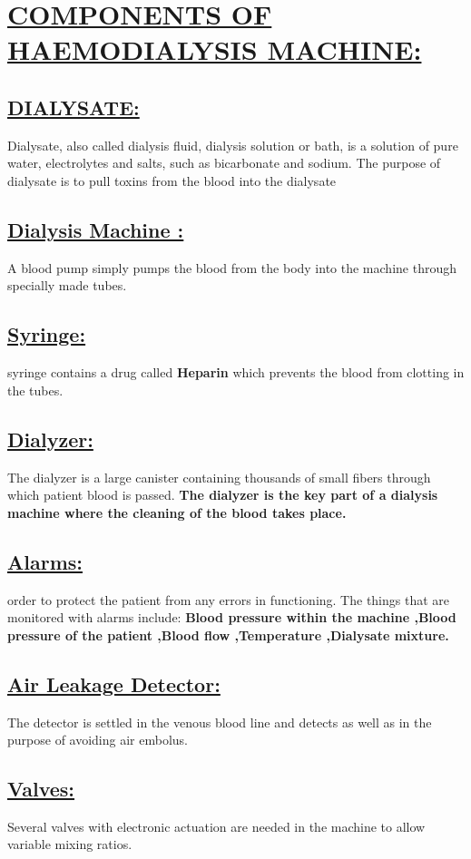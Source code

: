 \documentclass[12pt]{article}
\begin{document}
\section{\underline{COMPONENTS OF HAEMODIALYSIS MACHINE:}}
\subsection{\underline{DIALYSATE:}}
Dialysate, also called dialysis fluid, dialysis solution or bath, is a solution of pure water, electrolytes and salts, such as bicarbonate and sodium. The purpose of dialysate is to pull toxins from the blood into the dialysate
\subsection{\underline{Dialysis Machine :}}
A blood pump simply pumps the blood from the body into the machine through specially made tubes.
\subsection{\underline{Syringe:}}
syringe contains a drug called \textbf{Heparin} which prevents the blood from clotting in the tubes.
\subsection{\underline{Dialyzer:}}
The dialyzer is a large canister containing thousands of small fibers through which patient blood is passed. \textbf{The dialyzer is the key part of a dialysis machine where the cleaning of the blood takes place.}
\subsection{\underline{Alarms:}}
order to protect the patient from any errors in functioning. The things that are monitored with alarms include: \textbf{Blood pressure within the machine ,Blood pressure of the patient ,Blood flow ,Temperature ,Dialysate mixture.}
\subsection{\underline{Air Leakage Detector:}}
The detector is settled in the venous blood line and detects as well as in the purpose of avoiding air embolus.
\subsection{\underline{Valves:}}
Several valves with electronic actuation are needed in the machine to allow variable mixing ratios.
\end{document}
